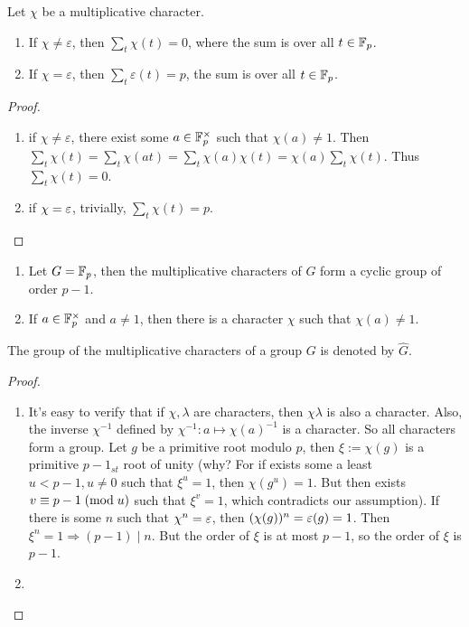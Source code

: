 \begin{proposition}Let $\chi$ be a multiplicative character.
\begin{enumerate}
	\item If $\chi\ne\varepsilon$, then $\sum_t\chi(t)=0$, where the sum is over all $t\in\mathbb{F}_p$.
	\item If $\chi=\varepsilon$, then $\sum_t\varepsilon(t) = p$, the sum is over all $t\in\mathbb{F}_p$.
\end{enumerate} 
\end{proposition}
\begin{proof}\mbox{}
\begin{enumerate}
	\item
	if $\chi\ne\varepsilon$, there exist some $a\in\mathbb{F}_p^\times$ such that $\chi(a)\ne 1$. Then $\sum_t\chi(t) =\sum_t\chi(at) = \sum_t\chi(a)\chi(t) = \chi(a)\sum_t\chi(t)$. Thus $\sum_t\chi(t)=0$.
	\item
	if $\chi=\varepsilon$, trivially, $\sum_t\chi(t)=p$.
\end{enumerate}
\end{proof}
\begin{proposition}\mbox{}
\begin{enumerate}
	\item
Let $G=\mathbb{F}_p$, then the multiplicative characters of $G$ form a cyclic group of order $p-1$. 
\item
If $a\in\mathbb{F}_p^\times$ and $a\ne1$, then there is a character $\chi$ such that $\chi(a)\ne1$.
\end{enumerate}
\end{proposition}
\begin{definition}
The group of the multiplicative characters of a group $G$ is denoted by $\hat{G}$.
\end{definition}
\begin{proof}\mbox{}
\begin{enumerate}
	\item
It's easy to verify that if $\chi,\lambda$ are characters, then $\chi\lambda$ is also a character. Also, the inverse $\chi^{-1}$ defined by $\chi^{-1}:a\mapsto \chi(a)^{-1}$ is a character. So all characters form a group. 
Let $g$ be a primitive root modulo $p$, then $\xi:=\chi(g)$ is a primitive $p-1_{st}$ root of unity (why? For if exists some a least $u<p-1, u\ne0$ such that $\xi^u = 1$, then $\chi(g^u)=1$. But then exists $v\equiv p-1\;(\mbox{mod}{\;u})$ such that $\xi^v=1$, which contradicts our assumption). If there is some $n$ such that $\chi^n=\varepsilon$, then $(\chi(g))^{n}=\varepsilon(g)=1$. Then $\xi^n=1 \Rightarrow (p-1)\mid n$. But the order of $\xi$ is at most $p-1$, so the order of $\xi$ is $p-1$.
	\item
\notcomplete
\end{enumerate}
\end{proof}
